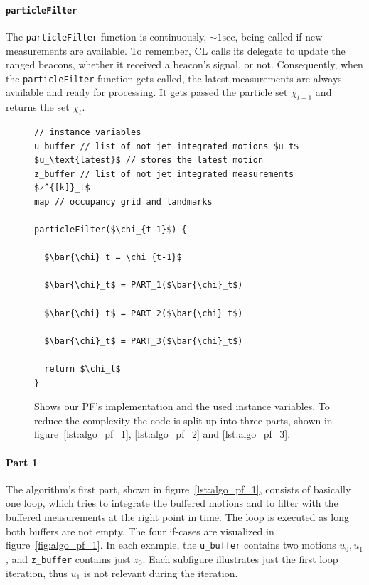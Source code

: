 \paragraph{\texttt{particleFilter}} The \texttt{particleFilter} function is continuously, $\sim 1 \text{sec}$, being called if new measurements are available. To remember, \acl{CL} calls its delegate to update the ranged beacons, whether it received a beacon's signal, or not. Consequently, when the \texttt{particleFilter} function gets called, the latest measurements are always available and ready for processing. It gets passed the particle set $\chi_{t-1}$ and returns the set $\chi_t$.

\begin{figure}
\begin{lstlisting}[mathescape]
// instance variables
u_buffer // list of not jet integrated motions $u_t$
$u_\text{latest}$ // stores the latest motion
z_buffer // list of not jet integrated measurements $z^{[k]}_t$
map // occupancy grid and landmarks

particleFilter($\chi_{t-1}$) {

  $\bar{\chi}_t = \chi_{t-1}$

  $\bar{\chi}_t$ = PART_1($\bar{\chi}_t$)
  
  $\bar{\chi}_t$ = PART_2($\bar{\chi}_t$)
  
  $\bar{\chi}_t$ = PART_3($\bar{\chi}_t$)
    
  return $\chi_t$
}
\end{lstlisting}
\caption{Shows our \acs{PF}'s implementation and the used instance variables. To reduce the complexity the code is split up into three parts, shown in figure~\ref{lst:algo_pf_1}, \ref{lst:algo_pf_2} and \ref{lst:algo_pf_3}.}
\label{lst:algo_pf}
\end{figure}


\paragraph{Part 1} The algorithm's first part, shown in figure~\ref{lst:algo_pf_1}, consists of basically one loop, which tries to integrate the buffered motions and to filter with the buffered measurements at the right point in time. The loop is executed as long both buffers are not empty. The four if-cases are visualized in figure~\ref{fig:algo_pf_1}. In each example, the \texttt{u\_buffer} contains two motions $u_0, u_1$, and \texttt{z\_buffer} contains just $z_0$. Each subfigure illustrates just the first loop iteration, thus $u_1$ is not relevant during the iteration.

